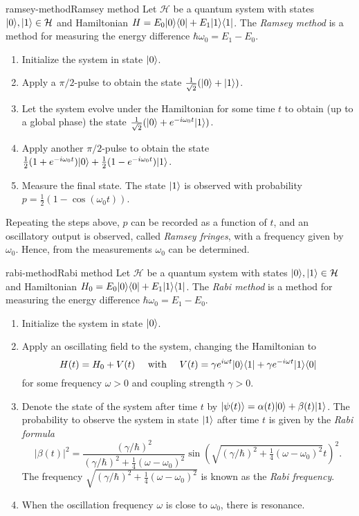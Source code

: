 \begin{topic}{ramsey-method}{Ramsey method}
    Let $\mathcal{H}$ be a quantum system with states $|0\rangle, |1\rangle \in \mathcal{H}$ and Hamiltonian $H = E_0 |0\rangle \langle0| + E_1 |1\rangle \langle1|$. The \emph{Ramsey method} is a method for measuring the energy difference $\hbar \omega_0 = E_1 - E_0$.
    \begin{enumerate}[label=(\arabic*)]
        \item Initialize the system in state $|0\rangle$.
        \item Apply a $\pi/2$-pulse to obtain the state $\frac{1}{\sqrt{2}} (|0\rangle + |1\rangle)$.
        \item Let the system evolve under the Hamiltonian for some time $t$ to obtain (up to a global phase) the state $\frac{1}{\sqrt{2}}(|0\rangle + e^{-i \omega_0 t} |1\rangle)$.
        \item Apply another $\pi/2$-pulse to obtain the state $\frac{1}{2} (1 + e^{-i \omega_0 t}) |0\rangle + \frac{1}{2} (1 - e^{-i \omega_0 t}) |1\rangle$.
        \item Measure the final state. The state $|1\rangle$ is observed with probability $p = \frac{1}{2}(1 - \cos(\omega_0 t))$.
    \end{enumerate}
    Repeating the steps above, $p$ can be recorded as a function of $t$, and an oscillatory output is observed, called \textit{Ramsey fringes}, with a frequency given by $\omega_0$. Hence, from the measurements $\omega_0$ can be determined.
\end{topic}

\begin{topic}{rabi-method}{Rabi method}
    Let $\mathcal{H}$ be a quantum system with states $|0\rangle, |1\rangle \in \mathcal{H}$ and Hamiltonian $H_0 = E_0 |0\rangle \langle0| + E_1 |1\rangle \langle1|$. The \emph{Rabi method} is a method for measuring the energy difference $\hbar \omega_0 = E_1 - E_0$.
    \begin{enumerate}[label=(\arabic*)]
        \item Initialize the system in state $|0\rangle$.
        \item Apply an oscillating field to the system, changing the Hamiltonian to
        \[ H(t) = H_0 + V(t) \quad \textup{ with } \quad V(t) = \gamma e^{i \omega t} |0\rangle \langle1| + \gamma e^{- i \omega t} |1\rangle \langle0| \]
        for some frequency $\omega > 0$ and coupling strength $\gamma > 0$.
        \item Denote the state of the system after time $t$ by $|\psi(t)\rangle = \alpha(t) |0\rangle + \beta(t) |1\rangle$. The probability to observe the system in state $|1\rangle$ after time $t$ is given by the \textit{Rabi formula}
        \[ |\beta(t)|^2 = \frac{(\gamma / \hbar)^2}{(\gamma / \hbar)^2 + \tfrac{1}{4} (\omega - \omega_0)^2} \sin \left( \sqrt{(\gamma / \hbar)^2 + \tfrac{1}{4} (\omega - \omega_0)^2} t \right)^2 . \]
        The frequency $\sqrt{(\gamma / \hbar)^2 + \tfrac{1}{4} (\omega - \omega_0)^2}$ is known as the \textit{Rabi frequency}.
        \item When the oscillation frequency $\omega$ is close to $\omega_0$, there is resonance.
    \end{enumerate}
\end{topic}

